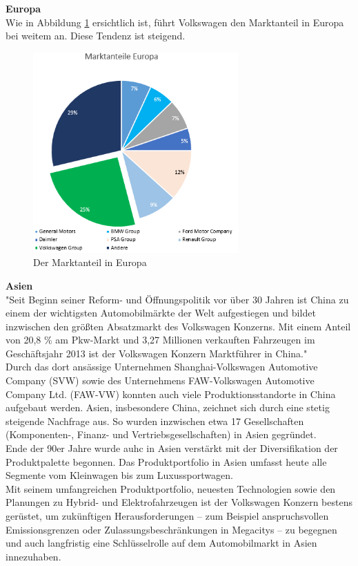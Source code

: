 \documentclass[12pt]{article}
\begin{document}
\noindent
\textbf{Europa}\\
Wie in Abbildung \ref{fig:markteuropa} ersichtlich ist, führt Volkswagen den Marktanteil in Europa bei weitem an. Diese Tendenz ist steigend.
\begin{figure}[here!]
\centering
\includegraphics[width=0.7\textwidth]{images/maie}
\caption{Der Marktanteil in Europa}
\label{fig:markteuropa}
\end{figure}\FloatBarrier
\noindent
\textbf{Asien}\\
"Seit Beginn seiner Reform- und Öffnungspolitik vor über 30 Jahren ist China zu einem der wichtigsten Automobilmärkte der Welt aufgestiegen und bildet inzwischen den größten Absatzmarkt des Volkswagen Konzerns. Mit einem Anteil von 20,8 \% am Pkw-Markt und 3,27 Millionen verkauften Fahrzeugen im Geschäftsjahr 2013 ist der Volkswagen Konzern Marktführer in China."\cite{vwwebsitechina}\\
Durch das dort ansässige Unternehmen Shanghai-Volkswagen Automotive Company (SVW) sowie des Unternehmens FAW-Volkswagen Automotive Company Ltd. (FAW-VW) konnten auch viele Produktionsstandorte in China aufgebaut werden.
Asien, insbesondere China, zeichnet sich durch eine stetig steigende Nachfrage aus. So wurden inzwischen etwa 17 Gesellschaften (Komponenten-, Finanz- und Vertriebsgesellschaften) in Asien gegründet. \\
Ende der 90er Jahre wurde auhc in Asien verstärkt mit der Diversifikation der Produktpalette begonnen. Das  Produktportfolio in Asien umfasst heute alle Segmente vom Kleinwagen bis zum Luxussportwagen.
\\
Mit seinem umfangreichen Produktportfolio, neuesten Technologien sowie den Planungen zu Hybrid- und Elektrofahrzeugen ist der Volkswagen Konzern bestens gerüstet, um zukünftigen Herausforderungen – zum Beispiel anspruchsvollen Emissionsgrenzen oder Zulassungsbeschränkungen in Megacitys – zu begegnen und auch langfristig eine Schlüsselrolle auf dem Automobilmarkt in Asien innezuhaben. 
\end{document}
